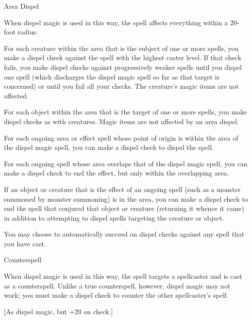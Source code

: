 {Area Dispel

	When dispel magic is used in this way, the spell affects everything within a 20-foot radius.


	For each creature within the area that is the subject of one or more spells, you make a dispel check against the spell with the highest caster level. If that check fails, you make dispel checks against progressively weaker spells until you dispel one spell (which discharges the dispel magic spell so far as that target is concerned) or until you fail all your checks. The creature's magic items are not affected.


	For each object within the area that is the target of one or more spells, you make dispel checks as with creatures. Magic items are not affected by an area dispel.


	For each ongoing area or effect spell whose point of origin is within the area of the dispel magic spell, you can make a dispel check to dispel the spell.


	For each ongoing spell whose area overlaps that of the dispel magic spell, you can make a dispel check to end the effect, but only within the overlapping area.


	If an object or creature that is the effect of an ongoing spell (such as a monster summoned by monster summoning) is in the area, you can make a dispel check to end the spell that conjured that object or creature (returning it whence it came) in addition to attempting to dispel spells targeting the creature or object.


	You may choose to automatically succeed on dispel checks against any spell that you have cast.

Counterspell

	When dispel magic is used in this way, the spell targets a spellcaster and is cast as a counterspell. Unlike a true counterspell, however, dispel magic may not work; you must make a dispel check to counter the other spellcaster's spell.
}
        
[As dispel magic, but +20 on check.]
        
